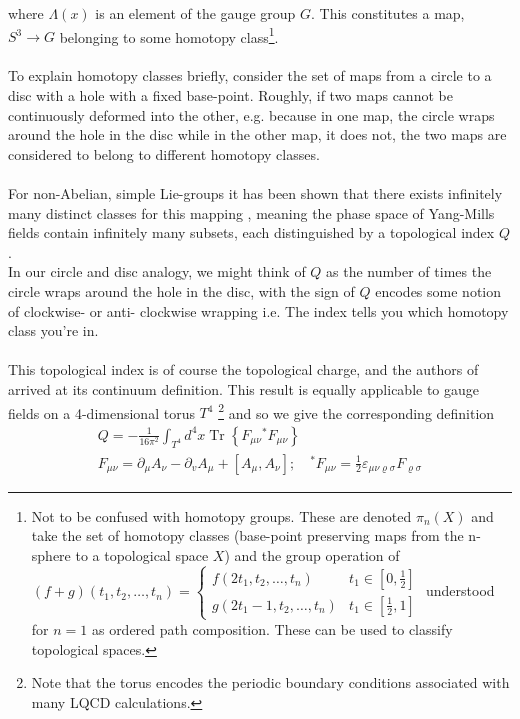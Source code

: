 \documentclass[a4paper,10pt]{book}
\begin{document}
where $\Lambda(x)$ is an element of the gauge group $G$. This constitutes a map, $S^3\rightarrow G$ belonging to some homotopy class\footnote{Not to be confused with homotopy groups. These are denoted $\pi_n(X)$ and take the set of homotopy classes (base-point preserving maps from the n-sphere to a topological space $X$) and the group operation of $(f+g)\left(t_{1}, t_{2}, \ldots, t_{n}\right)= \begin{cases}f\left(2 t_{1}, t_{2}, \ldots, t_{n}\right) & t_{1} \in\left[0, \frac{1}{2}\right] \\ g\left(2 t_{1}-1, t_{2}, \ldots, t_{n}\right) & t_{1} \in\left[\frac{1}{2}, 1\right]\end{cases}$ understood for $n=1$ as ordered path composition. These can be used to classify topological spaces.}.\\\\ To explain homotopy classes briefly, consider the set of maps from a circle to a disc with a hole with a fixed base-point. Roughly, if two maps cannot be continuously deformed into the other, e.g. because in one map, the circle wraps around the hole in the disc while in the other map, it does not, the two maps are considered to belong to different homotopy classes.\\\\ For non-Abelian, simple Lie-groups \cite{bredon1993topology} it has been shown that there exists infinitely many distinct classes for this mapping \cite{BelavinA.A1975Psot}, meaning the phase space of Yang-Mills fields contain infinitely many subsets, each distinguished by a topological index $Q$.\\In our circle and disc analogy, we might think of $Q$ as the number of times the circle wraps around the hole in the disc, with the sign of $Q$ encodes some notion of clockwise- or anti- clockwise wrapping i.e. The index tells you which homotopy class you're in.\\\\This topological index is of course the topological charge, and the authors of \cite{BelavinA.A1975Psot} arrived at its continuum definition. This result is equally applicable to gauge fields on a 4-dimensional torus $T^4$ \footnote{Note that the torus encodes the periodic boundary conditions associated with many LQCD calculations.} and so we give the corresponding definition
\begin{equation}\label{eq:topChargeCont}
\begin{gathered}
Q=-\frac{1}{16 \pi^{2}} \int_{T^{4}} d^{4} x \operatorname{Tr}\left\{F_{\mu \nu}{ }^{*} F_{\mu \nu}\right\} \\
F_{\mu \nu}=\partial_{\mu} A_{\nu}-\partial_{v} A_{\mu}+\left[A_{\mu}, A_{\nu}\right] ; \quad ^* F_{\mu \nu}=\frac{1}{2} \varepsilon_{\mu \nu \varrho \sigma} F_{\varrho \sigma}
\end{gathered}
\end{equation}
\end{document}
